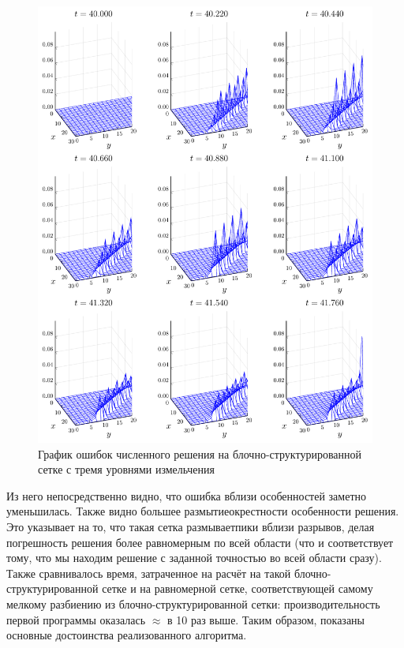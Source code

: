 \begin{figure}
    \centering
    \includegraphics[width=\textwidth, height=\textheight, keepaspectratio]{Теория_блочных_локально_адаптивных_сеток/Результаты_моделирования/errors_after.pdf}
    \caption{График ошибок численного решения на блочно-структурированной сетке с тремя уровнями измельчения}
    \label{fig:structured_errors}
\end{figure}
Из него непосредственно видно, что ошибка вблизи особенностей заметно уменьшилась.
Также видно большее \glqq размытие\grqq окрестности особенности решения.
Это указывает на то, что такая сетка \glqq размывает\grqq пики вблизи разрывов, делая погрешность решения более равномерным по всей области (что и соответствует тому, что мы находим решение с заданной точностью во всей области сразу).
Также сравнивалось время, затраченное на расчёт на такой блочно-структурированной сетке и на равномерной сетке, соответствующей самому мелкому разбиению из блочно-структурированной сетки: производительность первой программы оказалась $\approx$ в 10 раз выше.
Таким образом, показаны основные достоинства реализованного алгоритма.

